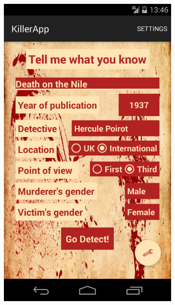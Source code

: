 \documentclass{mproj}
\begin{document}
\begin{figure}[h]
\begin{subfigure}{0.4\linewidth}
			\includegraphics[width=\linewidth]{images/text_input}	
		\end{subfigure}
		\quad
		\begin{subfigure}{0.4\linewidth}

\end{subfigure}
\end{figure}
\end{document}
